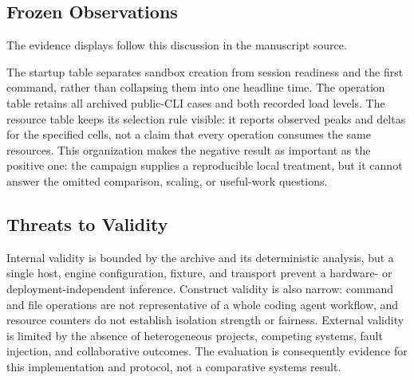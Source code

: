 \subsection{Frozen Observations}

The evidence displays follow this discussion in the manuscript source.

The startup table separates sandbox creation from session readiness and the
first command, rather than collapsing them into one headline time.  The
operation table retains all archived public-CLI cases and both recorded load
levels.  The resource table keeps its selection rule visible: it reports
observed peaks and deltas for the specified cells, not a claim that every
operation consumes the same resources.  This organization makes the negative
result as important as the positive one: the campaign supplies a reproducible
local treatment, but it cannot answer the omitted comparison, scaling, or
useful-work questions.

\subsection{Threats to Validity}

Internal validity is bounded by the archive and its deterministic analysis,
but a single host, engine configuration, fixture, and transport prevent a
hardware- or deployment-independent inference.  Construct validity is also
narrow: command and file operations are not representative of a whole coding
agent workflow, and resource counters do not establish isolation strength or
fairness.  External validity is limited by the absence of heterogeneous
projects, competing systems, fault injection, and collaborative outcomes.
The evaluation is consequently evidence for this implementation and protocol,
not a comparative systems result.
